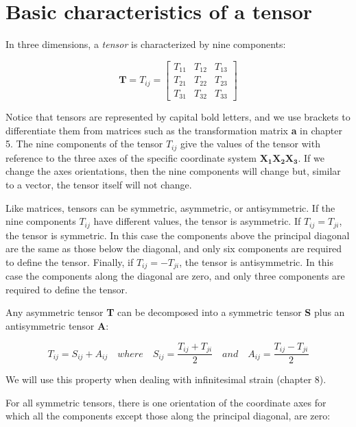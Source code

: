 \documentclass[a4paper , 12pt]{book}
\begin{document}
\section{Basic characteristics of a tensor}

In three dimensions, a \textit{tensor} is characterized by nine components:

\begin{equation}
    \mathbf{T}=T_{ij}=\begin{bmatrix}T_{11}&T_{12}&T_{13}\\T_{21}&T_{22}&T_{23}\\T_{31}&T_{32}&T_{33}\end{bmatrix}
\end{equation}

Notice that tensors are represented by capital bold letters, and we use brackets to differentiate them from matrices such as the transformation matrix \textbf{a} in chapter 5. The nine components of the tensor $T_{ij}$ give the values of the tensor with reference to the three axes of the specific coordinate system $\mathbf{X_1X_2X_3}$. If we change the axes orientations, then the nine components will change but, similar to a vector, the tensor itself will not change.

Like matrices, tensors can be symmetric, asymmetric, or antisymmetric. If the nine components $T_{ij}$ have different values, the tensor is asymmetric. If $T_{ij}=T_{ji}$, the tensor is symmetric. In this case the components above the principal diagonal are the same as those below the diagonal, and only six components are required to define the tensor. Finally, if $T_{ij}=-T_{ji}$, the tensor is antisymmetric. In this case the components along the diagonal are zero, and only three components are required to define the tensor.

Any asymmetric tensor \textbf{T} can be decomposed into a symmetric tensor \textbf{S} plus an antisymmetric tensor \textbf{A}:

\begin{equation}
    T_{ij}=S_{ij}+A_{ij}\quad where\quad S_{ij}=\frac{T_{ij}+T_{ji}}{2}\quad and\quad A_{ij}=\frac{T_{ij}-T_{ji}}{2}
\end{equation}

We will use this property when dealing with infinitesimal strain (chapter 8). 

For all symmetric tensors, there is one orientation of the coordinate axes for which all the components except those along the principal diagonal, are zero:
\end{document}
